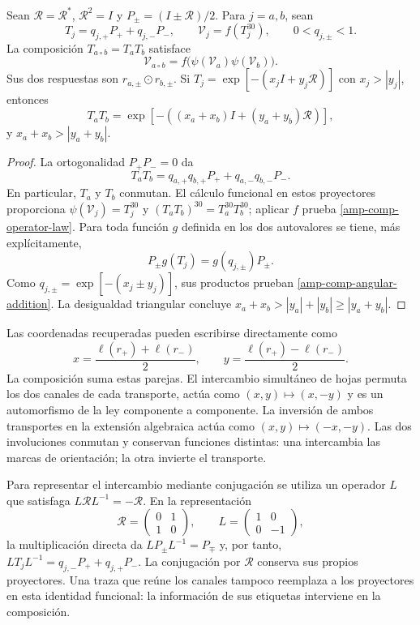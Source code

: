 \begin{proposition}
\label{amp-comp-operator}
Sean $\mathcal R=\mathcal R^*$, $\mathcal R^2=I$ y
$P_\pm=(I\pm\mathcal R)/2$. Para $j=a,b$, sean
\[
 T_j=q_{j,+}P_++q_{j,-}P_-,\qquad
 \mathcal V_j=f(T_j^{30}),\qquad 0<q_{j,\pm}<1.
\]
La composición $T_{a\circ b}=T_aT_b$ satisface
\begin{equation}
 \mathcal V_{a\circ b}
 =f\bigl(\psi(\mathcal V_a)\psi(\mathcal V_b)\bigr).
 \label{amp-comp-operator-law}
\end{equation}
Sus dos respuestas son $r_{a,\pm}\odot r_{b,\pm}$. Si
$T_j=\exp[-(x_jI+y_j\mathcal R)]$ con $x_j>|y_j|$, entonces
\begin{equation}
 T_aT_b=
 \exp[-((x_a+x_b)I+(y_a+y_b)\mathcal R)],
 \label{amp-comp-angular-addition}
\end{equation}
y $x_a+x_b>|y_a+y_b|$.
\end{proposition}
\begin{proof}
La ortogonalidad $P_+P_-=0$ da
\[
 T_aT_b=q_{a,+}q_{b,+}P_++q_{a,-}q_{b,-}P_-.
\]
En particular, $T_a$ y $T_b$ conmutan. El cálculo funcional en estos
proyectores proporciona
$\psi(\mathcal V_j)=T_j^{30}$ y
$(T_aT_b)^{30}=T_a^{30}T_b^{30}$; aplicar $f$ prueba
\eqref{amp-comp-operator-law}. Para toda función $g$ definida en los
dos autovalores se tiene, más explícitamente,
\[
 P_\pm g(T_j)=g(q_{j,\pm})P_\pm.
\]
Como $q_{j,\pm}=\exp[-(x_j\pm y_j)]$, sus productos prueban
\eqref{amp-comp-angular-addition}. La desigualdad triangular concluye
$x_a+x_b>|y_a|+|y_b|\geq|y_a+y_b|$.
\end{proof}

Las coordenadas recuperadas pueden escribirse directamente como
\[
 x=\frac{\ell(r_+)+\ell(r_-)}2,\qquad
 y=\frac{\ell(r_+)-\ell(r_-)}2.
\]
La composición suma estas parejas. El intercambio simultáneo de hojas
permuta los dos canales de cada transporte, actúa como
$(x,y)\mapsto(x,-y)$ y es un automorfismo de la ley componente a
componente. La inversión de ambos transportes en la extensión algebraica
actúa como $(x,y)\mapsto(-x,-y)$. Las dos involuciones conmutan y
conservan funciones distintas: una intercambia las marcas de orientación;
la otra invierte el transporte.

Para representar el intercambio mediante conjugación se utiliza un
operador $L$ que satisfaga $L\mathcal R L^{-1}=-\mathcal R$. En la
representación
\[
 \mathcal R=\begin{pmatrix}0&1\\1&0\end{pmatrix},\qquad
 L=\begin{pmatrix}1&0\\0&-1\end{pmatrix},
\]
la multiplicación directa da $LP_\pm L^{-1}=P_\mp$ y, por tanto,
$LT_jL^{-1}=q_{j,-}P_++q_{j,+}P_-$. La conjugación por
$\mathcal R$ conserva sus propios proyectores. Una traza que reúne los
canales tampoco reemplaza a los proyectores en esta identidad funcional:
la información de sus etiquetas interviene en la composición.

